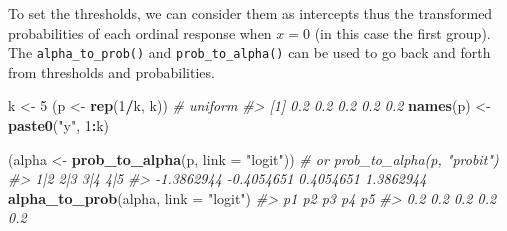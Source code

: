 \documentclass[
  man,floatsintext]{apa6}
\newenvironment{Shaded}{\begin{snugshade}}{\end{snugshade}}
\newcommand{\AttributeTok}[1]{\textcolor[rgb]{0.13,0.29,0.53}{#1}}
\newcommand{\CommentTok}[1]{\textcolor[rgb]{0.56,0.35,0.01}{\textit{#1}}}
\newcommand{\DecValTok}[1]{\textcolor[rgb]{0.00,0.00,0.81}{#1}}
\newcommand{\FunctionTok}[1]{\textcolor[rgb]{0.13,0.29,0.53}{\textbf{#1}}}
\newcommand{\NormalTok}[1]{#1}
\newcommand{\OtherTok}[1]{\textcolor[rgb]{0.56,0.35,0.01}{#1}}
\newcommand{\SpecialCharTok}[1]{\textcolor[rgb]{0.81,0.36,0.00}{\textbf{#1}}}
\newcommand{\StringTok}[1]{\textcolor[rgb]{0.31,0.60,0.02}{#1}}
\begin{document}
To set the thresholds, we can consider them as intercepts thus the transformed probabilities of each ordinal response when \(x = 0\) (in this case the first group). The \texttt{alpha\_to\_prob()} and \texttt{prob\_to\_alpha()} can be used to go back and forth from thresholds and probabilities.

\scriptsize

\begin{Shaded}
\begin{Highlighting}[]
\NormalTok{k }\OtherTok{\textless{}{-}} \DecValTok{5}
\NormalTok{(p }\OtherTok{\textless{}{-}} \FunctionTok{rep}\NormalTok{(}\DecValTok{1}\SpecialCharTok{/}\NormalTok{k, k)) }\CommentTok{\# uniform}
\CommentTok{\#\textgreater{} [1] 0.2 0.2 0.2 0.2 0.2}
\FunctionTok{names}\NormalTok{(p) }\OtherTok{\textless{}{-}} \FunctionTok{paste0}\NormalTok{(}\StringTok{"y"}\NormalTok{, }\DecValTok{1}\SpecialCharTok{:}\NormalTok{k)}

\NormalTok{(alpha }\OtherTok{\textless{}{-}} \FunctionTok{prob\_to\_alpha}\NormalTok{(p, }\AttributeTok{link =} \StringTok{"logit"}\NormalTok{)) }\CommentTok{\# or prob\_to\_alpha(p, "probit")}
\CommentTok{\#\textgreater{}        1|2        2|3        3|4        4|5 }
\CommentTok{\#\textgreater{} {-}1.3862944 {-}0.4054651  0.4054651  1.3862944}
\FunctionTok{alpha\_to\_prob}\NormalTok{(alpha, }\AttributeTok{link =} \StringTok{"logit"}\NormalTok{)}
\CommentTok{\#\textgreater{}  p1  p2  p3  p4  p5 }
\CommentTok{\#\textgreater{} 0.2 0.2 0.2 0.2 0.2}
\end{Highlighting}
\end{Shaded}

\normalsize

\scriptsize
\end{document}
